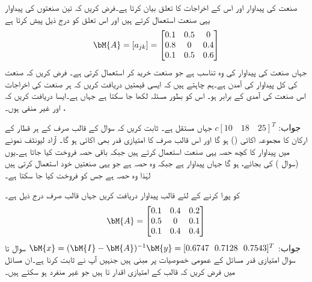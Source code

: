  صنعت کی پیداوار اور اس کے اخراجات کا تعلق بیان کرتا ہے۔فرض کریں کہ تین صنعتوں کی پیداوار یہی صنعت استعمال کرتے ہیں اور اس تعلق کو درج ذیل    پیش کرتا ہے
\begin{align*}
\bM{A}=[a_{jk}]=\begin{bmatrix} 0.1&0.5&0\\0.8&0&0.4\\0.1&0.5&0.6 \end{bmatrix}
\end{align*}
جہاں  صنعت  کی پیداوار کی وہ تناسب  ہے جو صنعت  خرید کر استعمال کرتی ہے۔ فرض کریں کہ صنعت  کی کل پیداوار کی آمدن   ہے۔ہم چاہتے ہیں کہ ایسی قیمتیں دریافت کریں کہ ہر صنعت کی اخراجات اس صنعت کی آمدی کے برابر ہو۔ اس کو بطور مسئلہ  لکھا جا سکتا ہے جہاں  ہے۔ایسا  دریافت کریں کہ ،  اور  غیر منفی ہوں۔

جواب:
$c[10\quad 18\quad 25]^T$
جہاں  مستقل ہے۔
ثابت کریں کہ سوال  کے قالب صرف  کے ہر قطار کے ارکان کا مجموعہ اکائی () ہو گا اور اس قالب صرف کا امتیازی قدر بھی اکائی ہو گا۔
آزاد لیونٹف نمونے میں پیداوار کا کچھ حصہ یہی صنعت استعمال کرتے ہیں جبکہ باقی حصہ فروخت کیا جاتا ہے۔یوں  (سوال ) کی بجائے،    ہو گا جہاں  پیداوار ہے جبکہ  وہ حصہ ہے جو یہی صنعتیں خود استعمال کرتی ہیں لہٰذا  وہ حصہ ہے جس کو فروخت کیا جا سکتا ہے۔

  کو پورا کرنے کے لئے قالب پیداوار  دریافت کریں جہاں قالب صرف درج ذیل ہے۔
\begin{align*}
\bM{A}=\begin{bmatrix} 0.1&0.4&0.2\\0.5&0&0.1\\0.1&0.4&0.4 \end{bmatrix}
\end{align*}
جواب:
$\bM{x}=(\bM{I}-\bM{A})^{-1}\bM{y}=[0.6747\,\,\,\,0.7128\,\,\,\,0.7543]^T$
سوال  تا سوال  امتیازی قدر مسائل کے عمومی خصوصیات پر مبنی ہیں جنہیں آپ نے ثابت کرنا ہے۔ان مسائل میں فرض کریں کہ  قالب  کے امتیازی اقدار  تا   ہیں جو غیر منفرد ہو سکتے ہیں۔

